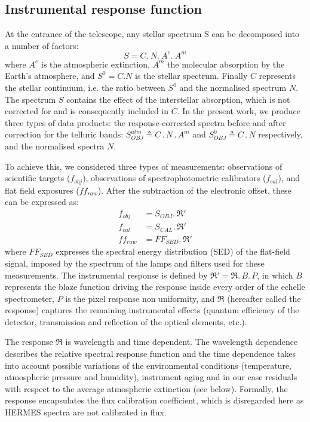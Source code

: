 \subsection{Instrumental response function}
At the entrance of the telescope, any stellar spectrum S can be decomposed into a number of factors: 
\begin{equation}
    S = C .\ N .\ A^e .\ A^m
\end{equation}
where $A^e$ is the atmospheric extinction, $A^m$ the molecular absorption by the Earth's atmosphere, and $S^0 = C . N$ is the stellar spectrum. Finally $C$ represents the stellar continuum, i.e. the ratio between $S^0$ and the normalised spectrum $N$. The spectrum $S$ contains the effect of the interstellar absorption, which is not corrected for and is consequently included in $C$. In the present work, we produce three types of data products: the response-corrected spectra before and after correction for the telluric bands: $S^{atm}_{OBJ} \triangleq C\,.\,N\,.\,A^m$ and $S^0_{OBJ} \triangleq C\,.\,N$ respectively, and the normalised spectra $N$.

To achieve this, we considered three types of measurements: observations of scientific targets ($f_{obj}$), observations of spectrophotometric calibrators ($f_{cal}$), and flat field exposures ($ff_{raw}$). After the subtraction of the electronic offset, these can be expressed as:
    \begin{align}
    \label{eq:obj}
    f_{obj} &= S_{OBJ} .\, \Re'\\
    \label{eq:cal}
    f_{cal} &= S_{CAL} .\, \Re'\\
    \label{eq:ff}
    ff_{raw} &= FF_{SED} .\, \Re'
    \end{align}
where $FF_{SED}$ expresses the spectral energy distribution (SED) of the flat-field signal, imposed by the spectrum of the lamps and filters used for these measurements. The instrumental response is defined by $\Re' = \Re .\, B .\, P$, in which $B$ represents the blaze function driving the response inside every order of the echelle spectrometer, $P$ is the pixel response non uniformity, and $\Re$ (hereafter called the response) captures the remaining instrumental effects (quantum efficiency of the detector, transmission and reflection of the optical elements, etc.). 

The response $\Re$ is wavelength and time dependent. The wavelength dependence describes the relative spectral response function and the time dependence takes into account possible variations of the environmental conditions (temperature, atmospheric pressure and humidity), instrument aging and in our case residuals with respect to the average atmospheric extinction (see below). Formally, the response encapsulates the flux calibration coefficient, which is disregarded here as HERMES spectra are not calibrated in flux. 

